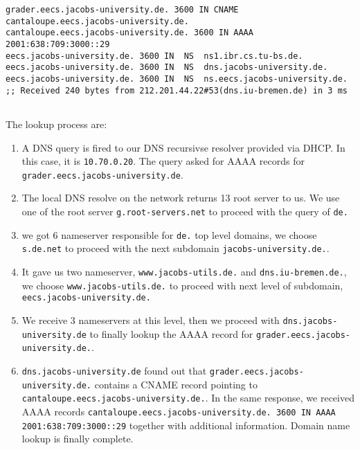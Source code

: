 \documentclass{article}
\begin{document}
\begin{verbatim}
grader.eecs.jacobs-university.de. 3600 IN CNAME	cantaloupe.eecs.jacobs-university.de.
cantaloupe.eecs.jacobs-university.de. 3600 IN AAAA 2001:638:709:3000::29
eecs.jacobs-university.de. 3600	IN	NS	ns1.ibr.cs.tu-bs.de.
eecs.jacobs-university.de. 3600	IN	NS	dns.jacobs-university.de.
eecs.jacobs-university.de. 3600	IN	NS	ns.eecs.jacobs-university.de.
;; Received 240 bytes from 212.201.44.22#53(dns.iu-bremen.de) in 3 ms


\end{verbatim}
The lookup process are\autocite{cloudflareDNS}:
\begin{enumerate}
\item
  A DNS query is fired to our DNS recursivse resolver provided via DHCP. In this case, it is
  \verb+10.70.0.20+. The query asked for AAAA records for
  \verb+grader.eecs.jacobs-university.de+.
\item
  The local DNS resolve on the network returns 13 root server to us. We use one
  of the root server \verb+g.root-servers.net+ to proceed with the query of
  \verb+de.+
\item
  we got 6 nameserver responsible for \verb+de.+ top level domains, we choose
  \verb+s.de.net+ to proceed with the next subdomain
  \verb+jacobs-university.de.+.
\item
  It gave us two nameserver,
  \verb+www.jacobs-utils.de.+
  and \verb+dns.iu-bremen.de.+, we choose
  \verb+www.jacobs-utils.de.+ to proceed with next level of subdomain,
  \verb+eecs.jacobs-university.de.+
\item
  We receive 3 nameservers at this level, then we proceed with
  \verb+dns.jacobs-university.de+ to finally lookup the AAAA record for
  \verb+grader.eecs.jacobs-university.de.+.
\item
  \verb+dns.jacobs-university.de+ found out that
  \verb+grader.eecs.jacobs-university.de.+ contains a CNAME record
  pointing to \verb+cantaloupe.eecs.jacobs-university.de.+. In the same
  response, we received AAAA records
  \verb+cantaloupe.eecs.jacobs-university.de. 3600 IN AAAA 2001:638:709:3000::29+
  together with additional information. Domain name lookup is finally complete.
\end{enumerate}
\end{document}
